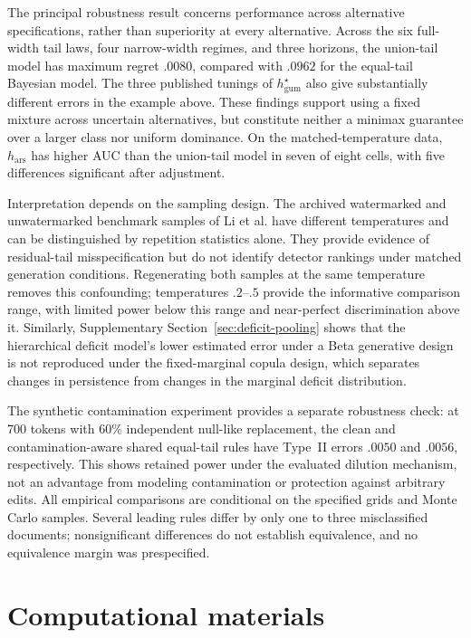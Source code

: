 \documentclass[11pt]{article}
\begin{document}
The principal robustness result concerns performance across alternative
specifications, rather than superiority at every alternative.  Across the six
full-width tail laws, four narrow-width regimes, and three horizons, the
union-tail model has maximum regret $.0080$, compared with $.0962$ for the
equal-tail Bayesian model.  The three published tunings of
$h^\star_{\mathrm{gum}}$ also give substantially different errors in the example
above.  These findings support using a fixed mixture across uncertain
alternatives, but constitute neither a minimax guarantee over a larger class nor
uniform dominance.  On the matched-temperature data, $h_{\mathrm{ars}}$ has
higher AUC than the union-tail model in seven of eight cells, with five
differences significant after adjustment.

Interpretation depends on the sampling design.  The archived watermarked and
unwatermarked benchmark samples of Li et al. have different temperatures and can be distinguished by
repetition statistics alone.  They provide evidence of residual-tail
misspecification but do not identify detector rankings under matched
generation conditions.  Regenerating both samples at the same temperature
removes this confounding; temperatures $.2$--$.5$ provide the informative
comparison range, with limited power below this range and near-perfect
discrimination above it.  Similarly, Supplementary Section~\ref{sec:deficit-pooling}
shows that the hierarchical deficit model's lower
estimated error under a Beta generative design is not reproduced under the
fixed-marginal copula design, which separates changes in persistence from
changes in the marginal deficit distribution.

The synthetic contamination experiment provides a separate robustness check: at 700
tokens with $60\%$ independent null-like replacement, the clean and
contamination-aware shared equal-tail rules have Type~II errors $.0050$ and
$.0056$, respectively.  This shows retained power under the evaluated dilution
mechanism, not an advantage from modeling contamination or protection against
arbitrary edits.  All empirical comparisons are conditional on the specified
grids and Monte Carlo samples.  Several leading rules differ by only one to
three misclassified documents; nonsignificant differences do not establish
equivalence, and no equivalence margin was prespecified.

\section*{Computational materials}
\end{document}
